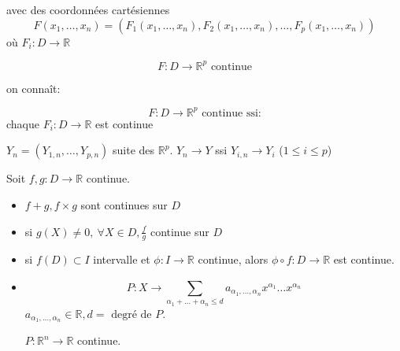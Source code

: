 \documentclass[a4paper]{report}
\newcommand\R{\ensuremath{\mathbb{R}}}
\theoremstyle{definition}
\begin{document}
avec des coordonnées cartésiennes
\[
F(x_1, \ldots, x_n) = (F_1(x_1, \ldots, x_n), F_2(x_1, \ldots, x_n), \ldots, F_p(x_1, \ldots, x_n))
\] 
où $F_i: D \to \R$

\[
F: D \to \R^p \text{ continue}
\] 

on connaît:
\begin{lemma}
   \[
   F: D \to  \R^p \text{ continue ssi:}
   \]  
   chaque $F_i: D \to \R$ est continue
\end{lemma}
\begin{preuve}
    $Y_n = (Y_{1,n}, \ldots, Y_{p, n})$  suite des $\R^p$. $Y_n \to Y$ ssi $Y_{i,n} \to Y_i$ ($1 \le i \le p$)
\end{preuve}
\begin{prop}
   Soit $f, g: D \to \R$ continue. 
   \begin{itemize}
       \item $f + g, f \times g$ sont continues sur $D$
       \item si  $g(X) \neq 0, \: \forall X \in D, \frac{f}{g}$ continue sur $D$
       \item si  $f(D) \subset I$ intervalle et $\phi: I \to \R$ continue, alors $\phi \circ f: D \to \R$ est continue.
       \item 
           \[
               P: X \to \sum_{\alpha_1 + \ldots + \alpha_n \le d}^{} a_{\alpha_1, \ldots, \alpha_n}x^{\alpha_1} \ldots x^{\alpha_n}
           \] 
           $a_{\alpha_1, \ldots, \alpha_n} \in \R, d = \text{ degré de } P$. 
           \par
           $P: \R^n \to \R$ continue.
   \end{itemize}
\end{prop}
\end{document}
